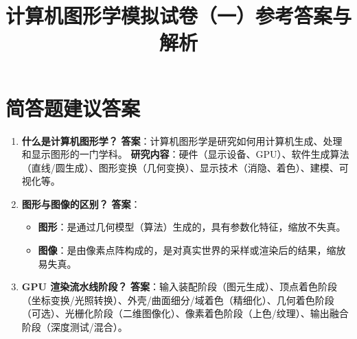 \documentclass[UTF8]{ctexart}
\title{计算机图形学模拟试卷（一）参考答案与解析}
\date{}
\begin{document}
\maketitle

\section{简答题建议答案}
\begin{enumerate}
    \item \textbf{什么是计算机图形学？}
    \textbf{答案}：计算机图形学是研究如何用计算机生成、处理和显示图形的一门学科。
    \textbf{研究内容}：硬件（显示设备、GPU）、软件生成算法（直线/圆生成）、图形变换（几何变换）、显示技术（消隐、着色）、建模、可视化等。
    
    \item \textbf{图形与图像的区别？}
    \textbf{答案}：
    \begin{itemize}
        \item \textbf{图形}：是通过几何模型（算法）生成的，具有参数化特征，缩放不失真。
        \item \textbf{图像}：是由像素点阵构成的，是对真实世界的采样或渲染后的结果，缩放易失真。
    \end{itemize}
    
    \item \textbf{GPU 渲染流水线阶段？}
    \textbf{答案}：输入装配阶段（图元生成）、顶点着色阶段（坐标变换/光照转换）、外壳/曲面细分/域着色（精细化）、几何着色阶段（可选）、光栅化阶段（二维图像化）、像素着色阶段（上色/纹理）、输出融合阶段（深度测试/混合）。
\end{enumerate}
\end{document}
